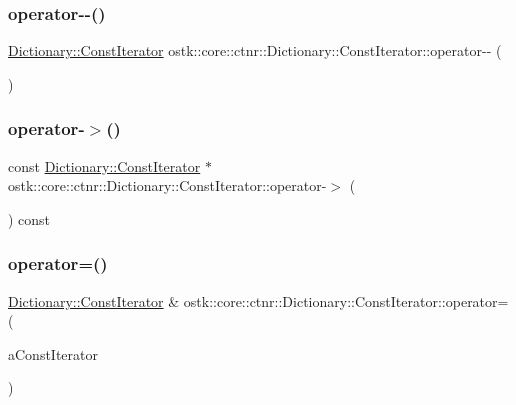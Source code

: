 \subsubsection{\texorpdfstring{operator-\/-\/()}{operator--()}\hspace{0.1cm}{\footnotesize\ttfamily [2/2]}}
{\footnotesize\ttfamily \hyperlink{classostk_1_1core_1_1ctnr_1_1_dictionary_1_1_const_iterator}{Dictionary\+::\+Const\+Iterator} ostk\+::core\+::ctnr\+::\+Dictionary\+::\+Const\+Iterator\+::operator-\/-\/ (\begin{DoxyParamCaption}\item[{int}]{ }\end{DoxyParamCaption})}

\mbox{\label{classostk_1_1core_1_1ctnr_1_1_dictionary_1_1_const_iterator_a18803913871b7f6c7425f9c3ce6c8162}} 
\subsubsection{\texorpdfstring{operator-\/$>$()}{operator->()}}
{\footnotesize\ttfamily const \hyperlink{classostk_1_1core_1_1ctnr_1_1_dictionary_1_1_const_iterator}{Dictionary\+::\+Const\+Iterator} $\ast$ ostk\+::core\+::ctnr\+::\+Dictionary\+::\+Const\+Iterator\+::operator-\/$>$ (\begin{DoxyParamCaption}{ }\end{DoxyParamCaption}) const}

\mbox{\label{classostk_1_1core_1_1ctnr_1_1_dictionary_1_1_const_iterator_aa775f33410700e7323e76696805664c6}} 
\subsubsection{\texorpdfstring{operator=()}{operator=()}}
{\footnotesize\ttfamily \hyperlink{classostk_1_1core_1_1ctnr_1_1_dictionary_1_1_const_iterator}{Dictionary\+::\+Const\+Iterator} \& ostk\+::core\+::ctnr\+::\+Dictionary\+::\+Const\+Iterator\+::operator= (\begin{DoxyParamCaption}\item[{const \hyperlink{classostk_1_1core_1_1ctnr_1_1_dictionary_1_1_const_iterator}{Const\+Iterator} \&}]{a\+Const\+Iterator }\end{DoxyParamCaption})}

